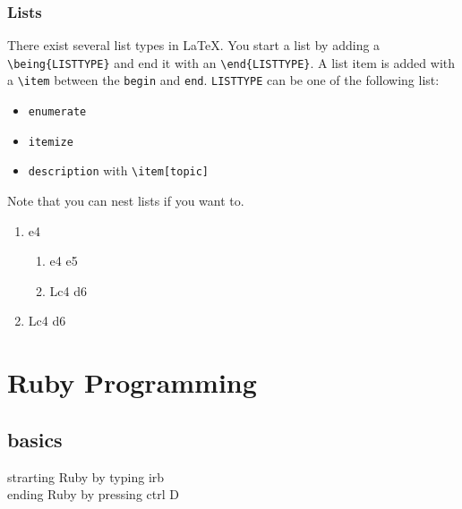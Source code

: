\documentclass[10pt,a4paper]{scrartcl}
\begin{document}
\subsubsection{Lists}
There exist several list types in \LaTeX. You start a list by adding a 
\verb$\being{LISTTYPE}$ and end it with an \verb$\end{LISTTYPE}$. A list item
is added with a \verb$\item$ between the \texttt{begin} and \texttt{end}.
\texttt{LISTTYPE} can be one of the following list:
\begin{itemize}
	\item \texttt{enumerate}
	\item \texttt{itemize}
	\item \texttt{description} with \verb$\item[topic]$
\end{itemize}
\noindent Note that you can nest lists if you want to.
\begin{enumerate}
	\item{e4} 	
		\begin{enumerate}
			\item{e4}   e5
			\item Lc4 d6
		\end{enumerate}
	\item Lc4 d6
\end{enumerate}


\section{Ruby Programming}

\subsection{basics}
strarting Ruby by typing irb
\\ ending Ruby by pressing ctrl D


\end{document}
